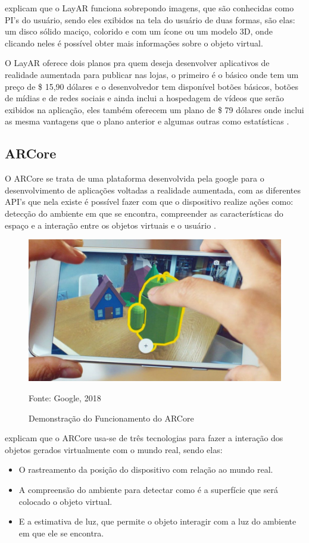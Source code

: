 		 explicam que o LayAR funciona sobrepondo imagens, que são conhecidas como PI's do usuário, sendo eles exibidos na tela do usuário de duas formas, são elas: um disco sólido maciço, colorido e com um ícone ou um modelo 3D, onde clicando neles é possível obter mais informações sobre o objeto virtual.
		
		O LayAR oferece dois planos pra quem deseja desenvolver aplicativos de realidade aumentada para publicar nas lojas, o primeiro é o básico onde tem um preço de \$ 15,90 dólares e o desenvolvedor tem disponível botões básicos, botões de mídias e de redes sociais e ainda inclui a hospedagem de vídeos que serão exibidos na aplicação, eles também oferecem um plano de \$ 79 dólares onde inclui as mesma vantagens que o plano anterior e algumas outras como estatísticas \cite{layar:2018}.
	\subsection{ARCore}
		O ARCore se trata de uma plataforma desenvolvida pela google para o desenvolvimento de aplicações voltadas a realidade aumentada, com as diferentes API's que nela existe é possível fazer com que o dispositivo realize ações como: detecção do ambiente em que se encontra, compreender as características do espaço e a interação entre os objetos virtuais e o usuário \cite{google:2018}.
		
		\begin{figure}[H]
			\centering
			\includegraphics[scale=0.4]{imagens/arcore}
			\caption{Demonstração do Funcionamento do ARCore}
			Fonte: Google, 2018
			\label{fig:arcore}
		\end{figure}
		
		 explicam que o ARCore usa-se de três tecnologias para fazer a interação dos objetos gerados virtualmente com o mundo real, sendo elas: 
			\begin{itemize}
				\item O rastreamento da posição do dispositivo com relação ao mundo real.
				\item A compreensão do ambiente para detectar como é a superfície que será colocado o objeto virtual. 
				\item E a estimativa de luz, que permite o objeto interagir com a luz do ambiente em que ele se encontra.
			\end{itemize} 
		
